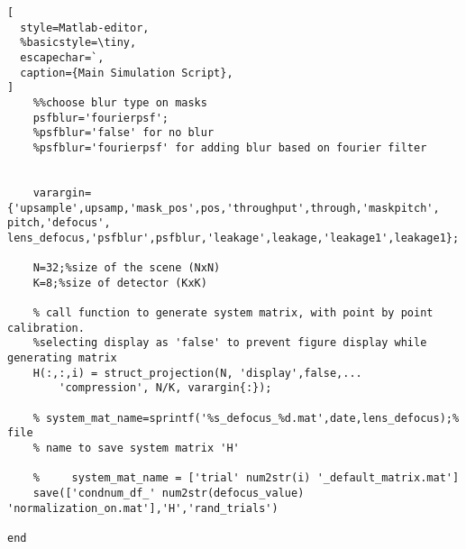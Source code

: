 \begin{lstlisting}[
  style=Matlab-editor,
  %basicstyle=\tiny,
  escapechar=`,
  caption={Main Simulation Script},
]
    %%choose blur type on masks
    psfblur='fourierpsf';
    %psfblur='false' for no blur
    %psfblur='fourierpsf' for adding blur based on fourier filter
    
    
    varargin={'upsample',upsamp,'mask_pos',pos,'throughput',through,'maskpitch', pitch,'defocus', lens_defocus,'psfblur',psfblur,'leakage',leakage,'leakage1',leakage1};
    
    N=32;%size of the scene (NxN)
    K=8;%size of detector (KxK)
    
    % call function to generate system matrix, with point by point calibration.
    %selecting display as 'false' to prevent figure display while generating matrix
    H(:,:,i) = struct_projection(N, 'display',false,...
        'compression', N/K, varargin{:});
    
    % system_mat_name=sprintf('%s_defocus_%d.mat',date,lens_defocus);% file
    % name to save system matrix 'H'
    
    %     system_mat_name = ['trial' num2str(i) '_default_matrix.mat']
    save(['condnum_df_' num2str(defocus_value) 'normalization_on.mat'],'H','rand_trials')
    
end

\end{lstlisting}



